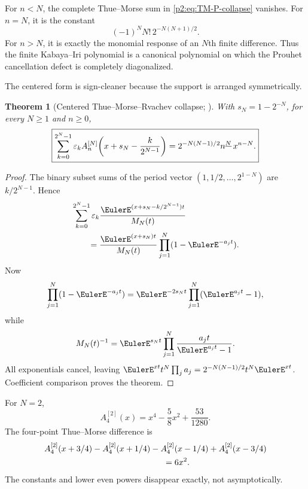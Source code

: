 \documentclass[11pt,oneside]{article}
\numberwithin{equation}{section}
\newtheorem{theorem}{Theorem}[section]
\theoremstyle{definition}
\theoremstyle{remark}
\newcommand{\eps}{\varepsilon}
\begin{document}
\begin{corollary}
\label{p2:cor:Prouhet-canonical}
For $n<N$, the complete Thue--Morse sum in \eqref{p2:eq:TM-P-collapse} vanishes.  For $n=N$, it is the
constant
\begin{equation}
 (-1)^NN!\,2^{-N(N+1)/2}.
 \label{p2:eq:TM-first-nonzero}
\end{equation}
For $n>N$, it is exactly the monomial response of an $N$th finite difference.  Thus the finite
Kabaya--Iri polynomial is a canonical polynomial on which the Prouhet cancellation defect is
completely diagonalized.
\end{corollary}

The centered form is sign-cleaner because the support is arranged symmetrically.

\begin{theorem}[Centered Thue--Morse--Rvachev collapse; \statusnew]
\label{p2:thm:TM-centered}
With $s_N=1-2^{-N}$, for every $N\ge1$ and $n\ge0$,
\begin{equation}
 \boxed{
 \sum_{k=0}^{2^N-1}\eps_k
 A_n^{[N]}\!\left(x+s_N-\frac{k}{2^{N-1}}\right)
 =2^{-N(N-1)/2}\fall nN\,x^{n-N}.
 }
 \label{p2:eq:TM-A-collapse}
\end{equation}
\end{theorem}

\begin{proof}
The binary subset sums of the period vector
$(1,1/2,\ldots,2^{1-N})$ are $k/2^{N-1}$.  Hence
\begin{align*}
 &\sum_{k=0}^{2^N-1}\eps_k
 \frac{\EulerE^{(x+s_N-k/2^{N-1})t}}{M_N(t)}\\
 &\qquad=
 \frac{\EulerE^{(x+s_N)t}}{M_N(t)}
 \prod_{j=1}^{N}(1-\EulerE^{-a_jt}).
\end{align*}
Now
\[
 \prod_{j=1}^{N}(1-\EulerE^{-a_jt})
 =\EulerE^{-2s_Nt}\prod_{j=1}^{N}(\EulerE^{a_jt}-1),
\]
while
\[
 M_N(t)^{-1}=\EulerE^{s_Nt}\prod_{j=1}^{N}\frac{a_jt}{\EulerE^{a_jt}-1}.
\]
All exponentials cancel, leaving
$\EulerE^{xt}t^N\prod_ja_j=2^{-N(N-1)/2}t^N\EulerE^{xt}$.  Coefficient comparison proves the theorem.
\end{proof}

\begin{example}
For $N=2$,
\begin{equation}
 A_4^{[2]}(x)=x^4-\frac58x^2+\frac{53}{1280}.
 \label{p2:eq:A4N2}
\end{equation}
The four-point Thue--Morse difference is
\begin{align}
 &A_4^{[2]}(x+3/4)-A_4^{[2]}(x+1/4)
 -A_4^{[2]}(x-1/4)+A_4^{[2]}(x-3/4)
 \notag\\
 &\hspace{5cm}=6x^2.
 \label{p2:eq:A4N2-example}
\end{align}
The constants and lower even powers disappear exactly, not asymptotically.
\end{example}
\end{document}
